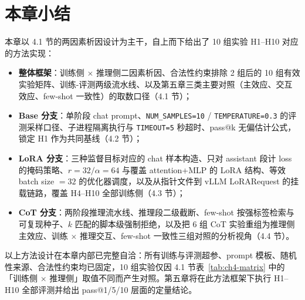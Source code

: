 \section{本章小结}

本章以 4.1 节的两因素析因设计为主干，自上而下给出了 10 组实验 H1--H10 对应的方法实现：
\begin{itemize}
    \item \textbf{整体框架}：训练侧 $\times$ 推理侧二因素析因、合法性约束排除 2 组后的 10 组有效实验矩阵、训练-评测两级流水线、以及第五章三类主要对照（主效应、交互效应、few-shot 一致性）的取数口径（4.1 节）；
    \item \textbf{Base 分支}：单阶段 chat prompt、\texttt{NUM\_SAMPLES=10} / \texttt{TEMPERATURE=0.3} 的评测采样口径、子进程隔离执行与 \texttt{TIMEOUT=5} 秒超时、pass@k 无偏估计公式，锁定 H1 作为共同基线（4.2 节）；
    \item \textbf{LoRA 分支}：三种监督目标对应的 chat 样本构造、只对 assistant 段计 loss 的掩码策略、$r{=}32/\alpha{=}64$ 与覆盖 attention+MLP 的 LoRA 结构、等效 batch size $=32$ 的优化器调度，以及从指针文件到 vLLM LoRARequest 的挂载链路，覆盖 H4--H10 全部训练侧（4.3 节）；
    \item \textbf{CoT 分支}：两阶段推理流水线、推理段二级截断、few-shot 按强标签检索与可复现种子、$k$ 匹配的脚本级强制拒绝，以及把 6 组 CoT 实验重组为推理侧主效应、训练 $\times$ 推理交互、few-shot 一致性三组对照的分析视角（4.4 节）。
\end{itemize}
以上方法设计在本章内部已完整自洽：所有训练与评测超参、prompt 模板、随机性来源、合法性约束均已固定，10 组实验仅因 4.1 节表~\ref{tab:ch4-matrix} 中的「训练侧 $\times$ 推理侧」取值不同而产生对照。第五章将在此方法框架下执行 H1--H10 全部评测并给出 pass@1/5/10 层面的定量结论。
